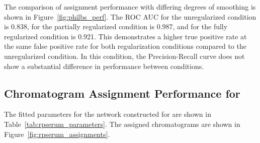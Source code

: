     The comparison of assignment performance with differing degrees of smoothing is
    shown in Figure~\ref{fig:philbs_perf}. The ROC AUC for the unregularized condition is
    0.838, for the partially regularized condition is 0.987, and for the fully regularized
    condition is 0.921. This demonstrates a higher true positive rate at the same false positive
    rate for both regularization conditions compared to the unregularized condition. In
    this condition, the Precision-Recall curve does not show a substantial difference in
    performance between conditions.

\subsection{Chromatogram Assignment Performance for \rpserum}
    The fitted parameters for the network constructed for \rpserum are shown in
    Table~\ref{tab:rpserum_parameters}. The assigned chromatograms are shown in
    Figure~\ref{fig:rpserum_assignments}.


